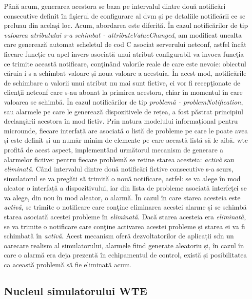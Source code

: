 Până acum, generarea acestora se baza pe intervalul dintre două notificări consecutive definit în fişierul de configurare al \gls{dvm} și pe detaliile notificării ce se preluau din același loc. Acum, abordarea este diferită. În cazul notificărilor de tip \textit{valoarea atributului s-a schimbat - attributeValueChanged}, am modificat unealta care generează automat scheletul de cod C asociat serverului \gls{netconf}, astfel încât fiecare funcție cu apel invers asociată unui atribut configurabil va invoca funcţia ce trimite această notificare, conţinând valorile reale de care este nevoie: obiectul căruia i s-a schimbat valoare și noua valoare a acestuia. În acest mod, notificările de schimbare a valorii unui atribut nu mai sunt fictive, ci vor fi recepţionate de clienţii \gls{netconf} care s-au abonat la primirea acestora, chiar în momentul în care valoarea se schimbă. În cazul notificărilor de tip \textit{problemă - problemNotification}, sau alarmele pe care le generează dispozitivele de rețea, a fost păstrat principiul declanşării acestora în mod fictiv. Prin natura modelului informațional pentru microunde, fiecare interfață are asociată o listă de probleme pe care le poate avea și este definit și un număr minim de elemente pe care această listă să le aibă. \gls{wte} profită de acest aspect, implementând următorul mecanism de generare a alarmelor fictive: pentru fiecare problemă se retine starea acesteia: \textit{activă} sau \textit{eliminată}. Când intervalul dintre două notificări fictive consecutive s-a scurs, simulatorul se va pregăti să trimită o nouă notificare, astfel: se va alege în mod aleator o interfață a dispozitivului, iar din lista de probleme asociată interfeţei se va alege, din nou în mod aleator, o alarmă. În cazul în care starea acesteia este \textit{activă}, se trimite o notificare care conţine eliminarea acestei alarme și se schimbă starea asociată acestei probleme în \textit{eliminată}. Dacă starea acesteia era \textit{eliminată}, se va trimite o notificare care conţine activarea acestei probleme și starea ei va fi schimbată în \textit{activă}. Acest mecanism oferă dezvoltatorilor de aplicații \gls{sdn} un oarecare realism al simulatorului, alarmele fiind generate aleatoriu și, în cazul în care o alarmă era deja prezentă în echipamentul de control, există și posibilitatea ca această problemă să fie eliminată acum.

\subsection{Nucleul simulatorului WTE}

